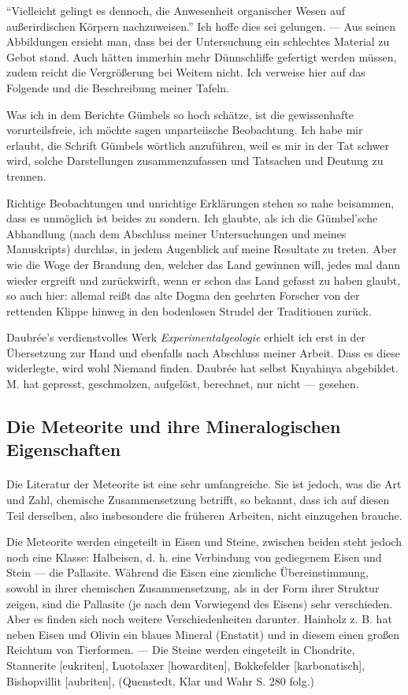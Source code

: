 \documentclass[a4paper, 12pt, oneside]{article}
\begin{document}
"`Vielleicht gelingt es dennoch, die Anwesenheit organischer Wesen auf außerirdischen Körpern nachzuweisen."' Ich hoffe dies sei gelungen. — Aus seinen Abbildungen ersieht man, dass bei der Untersuchung ein schlechtes Material zu Gebot stand. Auch hätten immerhin mehr Dünnschliffe gefertigt werden müssen, zudem reicht die Vergrößerung bei Weitem nicht. Ich verweise hier auf das Folgende und die Beschreibung meiner Tafeln.

Was ich in dem Berichte Gümbels so hoch schätze, ist die gewissenhafte vorurteilsfreie, ich möchte sagen unparteiische Beobachtung. Ich habe mir erlaubt, die Schrift Gümbels wörtlich anzuführen, weil es mir in der Tat schwer wird, solche Darstellungen zusammenzufassen und Tatsachen und Deutung zu trennen.

Richtige Beobachtungen und unrichtige Erklärungen stehen so nahe beisammen, dass es unmöglich ist beides zu sondern. Ich glaubte, als ich die Gümbel'sche Abhandlung (nach dem Abschluss meiner Untersuchungen und meines Manuskripts) durchlas, in jedem Augenblick auf meine Resultate zu treten. Aber wie die Woge der Brandung den, welcher das Land gewinnen will, jedes mal dann wieder ergreift und zurückwirft, wenn er schon das Land gefasst zu haben glaubt, so auch hier: allemal reißt das alte Dogma den geehrten Forscher von der rettenden Klippe hinweg in den bodenlosen Strudel der Traditionen zurück.

Daubrée's verdienstvolles Werk \emph{Experimentalgeologie} erhielt ich erst in der Übersetzung zur Hand und ebenfalls nach Abschluss meiner Arbeit. Dass es diese widerlegte, wird wohl Niemand finden. Daubrée hat selbst Knyahinya abgebildet. M. hat gepresst, geschmolzen, aufgelöst, berechnet, nur nicht — gesehen.
\clearpage
\subsection{Die Meteorite und ihre Mineralogischen Eigenschaften}
\paragraph{}
Die Literatur der Meteorite ist eine sehr umfangreiche. Sie ist jedoch, was die Art und Zahl, chemische Zusammensetzung betrifft, so bekannt, dass ich auf diesen Teil derselben, also insbesondere die früheren Arbeiten, nicht einzugehen brauche.

Die Meteorite werden eingeteilt in Eisen und Steine, zwischen beiden steht jedoch noch eine Klasse: Halbeisen, d. h. eine Verbindung von gediegenem Eisen und Stein — die Pallasite. Während die Eisen eine ziemliche Übereinstimmung, sowohl in ihrer chemischen Zusammensetzung, als in der Form ihrer Struktur zeigen, sind die Pallasite (je nach dem Vorwiegend des Eisens) sehr verschieden. Aber es finden sich noch weitere Verschiedenheiten darunter. Hainholz z. B. hat neben Eisen und Olivin ein blaues Mineral (Enstatit) und in diesem einen großen Reichtum von Tierformen. — Die Steine werden eingeteilt in Chondrite, Stannerite [eukriten], Luotolaxer [howarditen], Bokkefelder [karbonatisch], Bishopvillit [aubriten], (Quenstedt, Klar und Wahr S. 280 folg.)
\end{document}
